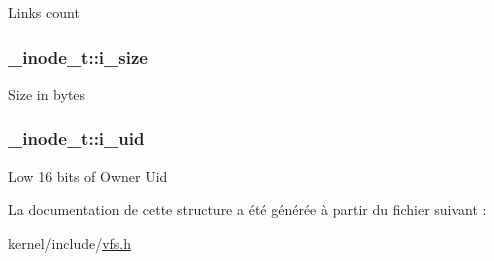 Links count \hypertarget{struct__inode__t_aed37b31c96c90873201abfc8b4b3e463}{
\subsubsection[{i\-\_\-size}]{ \-\_\-inode\-\_\-t\-::i\-\_\-size}}\label{struct__inode__t_aed37b31c96c90873201abfc8b4b3e463}
Size in bytes \hypertarget{struct__inode__t_a7ddcb65050ac0b4c9cfbacd495d56f4b}{
\subsubsection[{i\-\_\-uid}]{ \-\_\-inode\-\_\-t\-::i\-\_\-uid}}\label{struct__inode__t_a7ddcb65050ac0b4c9cfbacd495d56f4b}
Low 16 bits of Owner Uid 

La documentation de cette structure a été générée à partir du fichier suivant \-:\begin{DoxyCompactItemize}
\item 
kernel/include/\hyperlink{vfs_8h}{vfs.\-h}\end{DoxyCompactItemize}
